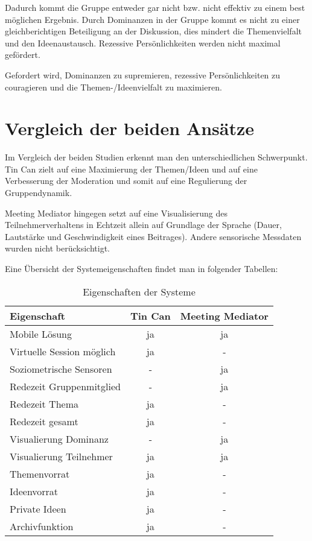\documentclass{seminarvorlage}
\begin{document}
Dadurch kommt die Gruppe entweder gar nicht bzw. nicht effektiv zu einem best
möglichen Ergebnis. Durch Dominanzen in der Gruppe kommt es nicht zu einer
gleichberichtigen Beteiligung an der Diskussion, dies mindert die Themenvielfalt
und den Ideenaustausch. Rezessive Persönlichkeiten werden nicht maximal
gefördert.

Gefordert wird, Dominanzen zu supremieren, rezessive Per\-sön\-lich\-keit\-en zu
couragieren und die Themen-/Ideenvielfalt zu maximieren.




\section{Vergleich der beiden Ansätze}
Im Vergleich der beiden Studien erkennt man den unterschiedlichen Schwerpunkt.
Tin Can zielt auf eine Maximierung der Themen/Ideen und auf eine Verbesserung
der Moderation und somit auf eine Regulierung der Gruppendynamik.

Meeting Mediator hingegen setzt auf eine Visualisierung des Teilnehmerverhaltens
in Echtzeit allein auf Grundlage der Sprache (Dauer, Lautstärke und Geschwindigkeit
eines Beitrages). Andere sensorische Messdaten wurden nicht berücksichtigt.

Eine Übersicht der Systemeigenschaften findet man in folgender Tabellen:
\begin{table}
\begin{tabular}{ l | c | c }
  Eigenschaft & Tin Can & Meeting Mediator \\
  \hline
  Mobile Lösung & ja & ja \\
  Virtuelle Session möglich & ja & - \\
  Soziometrische Sensoren & - & ja \\
  \hline
  Redezeit Gruppenmitglied & - & ja \\
  Redezeit Thema  & ja & - \\
  Redezeit gesamt & ja & - \\
  \hline
  
  Visualierung Dominanz & - & ja \\
  Visualierung Teilnehmer & ja & ja \\
  \hline
  Themenvorrat & ja & - \\
  Ideenvorrat & ja & - \\
  Private Ideen & ja & - \\
  Archivfunktion & ja & - \\
  

\end{tabular}
\caption{Eigenschaften der Systeme}
\end{table}
\end{document}

